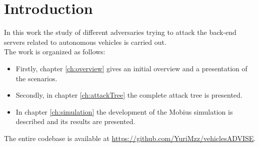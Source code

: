 %
\chapter{Introduction}\label{ch:introduction}
In this work the study of different adversaries trying to attack the back-end servers related to autonomous vehicles is carried out.\\

The work is organized as follows:
\begin{itemize}
    \item Firstly, chapter \ref{ch:overview} gives an initial overview and a presentation of the scenarios.
    \item Secondly, in chapter \ref{ch:attackTree} the complete attack tree is presented.
    \item In chapter \ref{ch:simulation} the development of the Mobius simulation is described and its results are presented.
\end{itemize}
    
\noindent
The entire codebase is available at \url{https://github.com/YuriMzz/vehiclesADVISE}.
